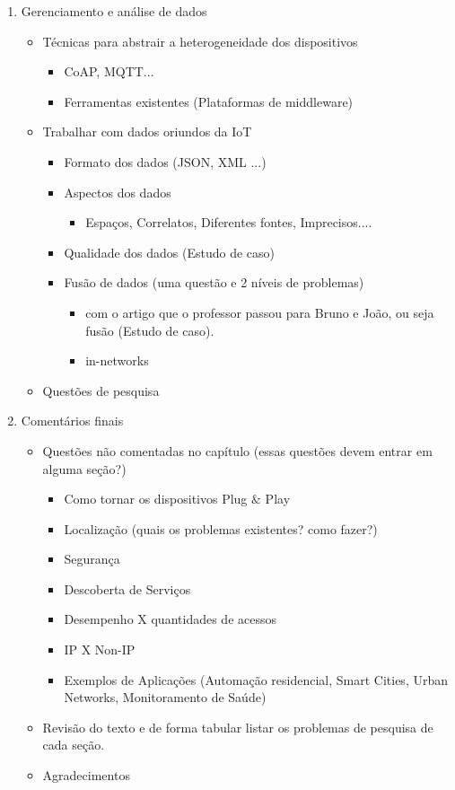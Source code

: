 \documentclass{SBCbookchapter}
\begin{document}
\begin{enumerate}
\begin{itemize}
  \end{itemize}

  \item Gerenciamento e análise de dados
    \begin{itemize}
      \item Técnicas para abstrair a heterogeneidade dos dispositivos
	\begin{itemize}
	 \item CoAP, MQTT...
	 \item Ferramentas existentes (Plataformas de middleware)
	\end{itemize}

      \item Trabalhar com dados oriundos da IoT
	\begin{itemize}
	  \item Formato dos dados (JSON, XML ...)
	  \item Aspectos dos dados
	  \begin{itemize}
	    \item Espaços, Correlatos, Diferentes fontes, Imprecisos....
	  \end{itemize}
	  \item Qualidade dos dados (Estudo de caso)
	  \item Fusão de dados (uma questão e 2 níveis de problemas)
	  \begin{itemize}
	    \item com o artigo que o professor passou para Bruno e 
João, ou seja fusão (Estudo de caso).
	    \item in-networks
	  \end{itemize}
	\end{itemize}

      \item Questões de pesquisa
    \end{itemize}
    
  \item Comentários finais
    \begin{itemize}
      \item Questões não comentadas no capítulo (essas questões devem entrar em 
alguma seção?)
      \begin{itemize}
	\item Como tornar os dispositivos Plug $\&$ Play
	\item Localização (quais os problemas existentes? como fazer?)
	\item Segurança
	\item Descoberta de Serviços
	\item Desempenho X quantidades de acessos
	\item IP X Non-IP
	\item Exemplos de Aplicações (Automação residencial, Smart Cities, 
Urban Networks, Monitoramento de Saúde)
      \end{itemize}
      \item Revisão do texto e de forma tabular listar os problemas de pesquisa 
de cada seção.
      \item Agradecimentos
    \end{itemize}



\end{enumerate}
\end{document}
